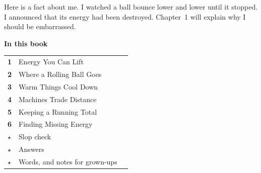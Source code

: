 \begin{multix}[hmm]\multixbot[hmm]\tcblower
Here is a fact about me. I watched a ball bounce lower and lower until it stopped. I announced that its energy had been destroyed. Chapter~1 will explain why I should be embarrassed.
\end{multix}
\clearpage

\thispagestyle{plain}
{\sans\bfseries\LARGE\color{ink} In this book}\par\vspace{0.2cm}
{\sans\large
\begin{tabular}{@{}p{0.9cm}p{7.6cm}r@{}}
\textcolor{tangerine}{\bfseries 1} & Energy You Can Lift & \pageref{ch1}\\[3pt]
\textcolor{tangerine}{\bfseries 2} & Where a Rolling Ball Goes & \pageref{ch2}\\[3pt]
\textcolor{tangerine}{\bfseries 3} & Warm Things Cool Down & \pageref{ch3}\\[3pt]
\textcolor{tangerine}{\bfseries 4} & Machines Trade Distance & \pageref{ch4}\\[3pt]
\textcolor{tangerine}{\bfseries 5} & Keeping a Running Total & \pageref{ch5}\\[3pt]
\textcolor{tangerine}{\bfseries 6} & Finding Missing Energy & \pageref{ch6}\\[3pt]
\textcolor{sky}{\bfseries $\star$} & Slop check & \pageref{slop}\\[3pt]
\textcolor{sky}{\bfseries $\star$} & Answers & \pageref{answers}\\[3pt]
\textcolor{sky}{\bfseries $\star$} & Words, and notes for grown-ups & \pageref{notes}\\
\end{tabular}}

